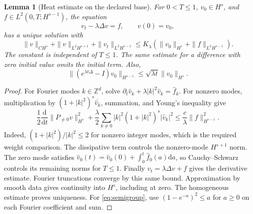 \documentclass[11pt]{article}
\newtheorem{lemma}[theorem]{Lemma}
\newcommand{\dd}{\mathrm d}
\begin{document}
\begin{lemma}[Heat estimate on the declared base]
For $0<T\leq1$, $v_0\in H^s$, and $f\in L^2(0,T;H^{s-1})$, the equation
\begin{equation}
 v_t-\lambda\Delta v=f,\qquad v(0)=v_0,
\end{equation}
has a unique solution with
\begin{equation}
 \|v\|_{CH^s}+\|v\|_{L^2H^{s+1}}+\|v_t\|_{L^2H^{s-1}}
 \leq K_\lambda\left(\|v_0\|_{H^s}+\|f\|_{L^2H^{s-1}}\right).
 \label{eq:heatestimate}
\end{equation}
The constant is independent of $T\leq1$. The same estimate for a difference with zero initial value omits the initial term. Also,
\begin{equation}
 \|(e^{\lambda t\Delta}-I)v_0\|_{H^{s-1}}
 \leq\sqrt{\lambda t}\|v_0\|_{H^s}.
 \label{eq:semigroup}
\end{equation}
\label{lem:heat}
\end{lemma}
\begin{proof}
For Fourier modes $k\in\mathbb Z^d$, solve
$\partial_t\widehat v_k+\lambda|k|^2\widehat v_k=\widehat f_k$.
For nonzero modes, multiplication by $(1+|k|^2)^s\overline{\widehat v_k}$, summation, and Young's inequality give
\begin{equation}
 \frac12\frac{\dd}{\dd t}\|P_{\ne0}v\|_{H^s}^2
 +\frac\lambda2\sum_{k\ne0}|k|^2(1+|k|^2)^s|\widehat v_k|^2
 \leq\frac c\lambda\|f\|_{H^{s-1}}^2.
 \label{eq:fourierenergy}
\end{equation}
Indeed, $(1+|k|^2)/|k|^2\leq2$ for nonzero integer modes, which is the required weight comparison. The dissipative term controls the nonzero-mode $H^{s+1}$ norm. The zero mode satisfies
$\widehat v_0(t)=\widehat v_0(0)+\int_0^t\widehat f_0(a)\dd a$,
so Cauchy--Schwarz controls its remaining norms for $T\leq1$. Finally $v_t=\lambda\Delta v+f$ gives the derivative estimate. Fourier truncations converge by this same bound. Approximation by smooth data gives continuity into $H^s$, including at zero. The homogeneous estimate proves uniqueness. For \eqref{eq:semigroup}, use $(1-e^{-a})^2\leq a$ for $a\geq0$ on each Fourier coefficient and sum.
\end{proof}
\end{document}
